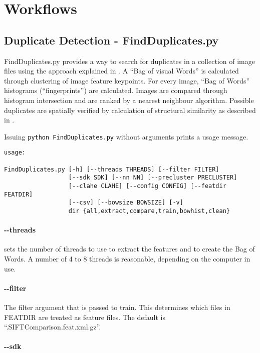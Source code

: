 \documentclass{hitec}
\begin{document}
\section{Workflows}

\subsection{Duplicate Detection - \ttfamily FindDuplicates.py}

FindDuplicates.py provides a way to search for duplicates in a collection of
image files using the approach explained in \cite{ait1}. A ``Bag of visual Words'' 
is calculated through clustering of image feature keypoints. For 
every image, ``Bag of Words'' histograms (``fingerprints'') are calculated. Images are
compared through histogram intersection and are ranked by a nearest neighbour algorithm. 
Possible duplicates are spatially verified by
calculation of structural similarity as described in \cite{ssim}.


Issuing \verb+python FindDuplicates.py+ without arguments prints a usage message.
\clearpage
\begin{verbatim}
usage: 

FindDuplicates.py [-h] [--threads THREADS] [--filter FILTER]
                  [--sdk SDK] [--nn NN] [--precluster PRECLUSTER]
                  [--clahe CLAHE] [--config CONFIG] [--featdir FEATDIR]
                  [--csv] [--bowsize BOWSIZE] [-v]
                  dir {all,extract,compare,train,bowhist,clean}
\end{verbatim}

\paragraph{\ttfamily-{}-threads} 

sets the number of threads to use to extract the features and to create the Bag
of Words. A number of 4 to 8 threads is reasonable, depending on the computer in use.

\paragraph{\ttfamily-{}-filter}

The filter argument that is passed to {\ttfamily train}. This determines which files in
FEATDIR are treated as feature files. The default is ``.SIFTComparison.feat.xml.gz''.

\paragraph{\ttfamily-{}-sdk}
\end{document}
